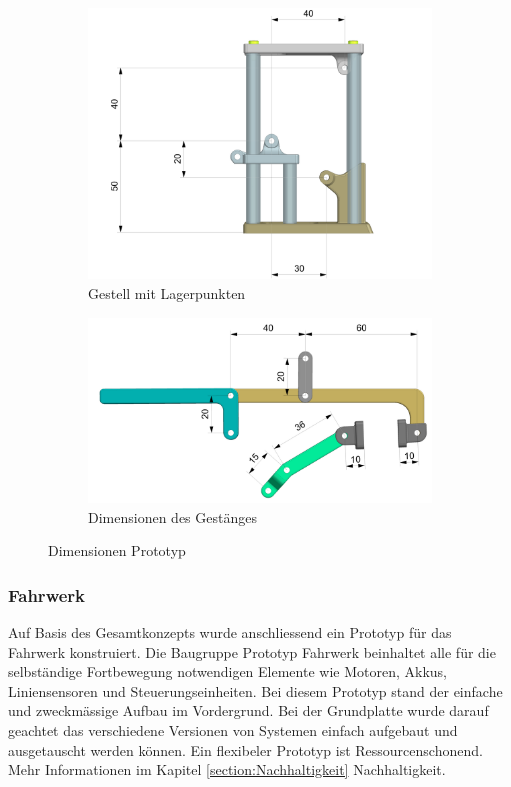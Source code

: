 \begin{figure}[H]
\begin{subfigure}{0.9\textwidth}
\includegraphics[width=\textwidth]{assets/greifer-prototyp/Greifer_Dimensionen_Lagerpunkte.png}
\caption{Gestell mit Lagerpunkten}
\label{fig:gripper-frame-mounting-points}
\end{subfigure}
\begin{subfigure}{0.9\textwidth}
\includegraphics[width=\textwidth]{assets/greifer-prototyp/Greifer_Dimensionen_Arme.png}
\caption{Dimensionen des Gestänges}
\label{fig:gripper-linkage-dimensions}
\end{subfigure}
\caption{Dimensionen Prototyp}
\label{gripper-prototype-dimensions}
\end{figure}

\subsubsection{Fahrwerk}

Auf Basis des Gesamtkonzepts wurde anschliessend ein Prototyp für das Fahrwerk konstruiert. Die Baugruppe Prototyp Fahrwerk beinhaltet alle für die selbständige Fortbewegung notwendigen Elemente wie Motoren, Akkus, Liniensensoren und Steuerungseinheiten.  Bei diesem Prototyp stand der einfache und zweckmässige Aufbau im Vordergrund. Bei der Grundplatte wurde darauf geachtet das verschiedene  Versionen von Systemen einfach aufgebaut und ausgetauscht werden können. Ein flexibeler Prototyp ist Ressourcenschonend. Mehr Informationen im Kapitel \ref{section:Nachhaltigkeit} Nachhaltigkeit. 

